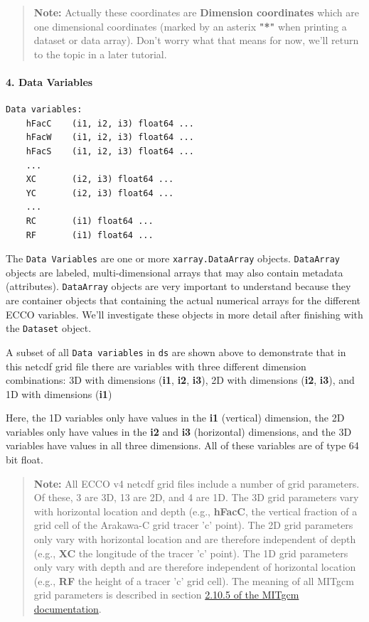 \documentclass[11pt]{article}
\begin{document}
\begin{quote}
\textbf{Note:} Actually these coordinates are \textbf{Dimension
coordinates} which are one dimensional coordinates (marked by an asterix
\textbf{"*"} when printing a dataset or data array). Don't worry what
that means for now, we'll return to the topic in a later tutorial.
\end{quote}

\paragraph{4. Data Variables}\label{data-variables}

\begin{verbatim}
Data variables:
    hFacC    (i1, i2, i3) float64 ...
    hFacW    (i1, i2, i3) float64 ...
    hFacS    (i1, i2, i3) float64 ...
    ...
    XC       (i2, i3) float64 ...
    YC       (i2, i3) float64 ...
    ...
    RC       (i1) float64 ...
    RF       (i1) float64 ...
\end{verbatim}

The \texttt{Data\ Variables} are one or more \texttt{xarray.DataArray}
objects. \texttt{DataArray} objects are labeled, multi-dimensional
arrays that may also contain metadata (attributes). \texttt{DataArray}
objects are very important to understand because they are container
objects that containing the actual numerical arrays for the different
ECCO variables. We'll investigate these objects in more detail after
finishing with the \texttt{Dataset} object.

A subset of all \texttt{Data\ variables} in \texttt{ds} are shown above
to demonstrate that in this netcdf grid file there are variables with
three different dimension combinations: 3D with dimensions (\textbf{i1},
\textbf{i2}, \textbf{i3}), 2D with dimensions (\textbf{i2},
\textbf{i3}), and 1D with dimensions (\textbf{i1})

Here, the 1D variables only have values in the \textbf{i1} (vertical)
dimension, the 2D variables only have values in the \textbf{i2} and
\textbf{i3} (horizontal) dimensions, and the 3D variables have values in
all three dimensions. All of these variables are of type 64 bit float.

\begin{quote}
\textbf{Note:} All ECCO v4 netcdf grid files include a number of grid
parameters. Of these, 3 are 3D, 13 are 2D, and 4 are 1D. The 3D grid
parameters vary with horizontal location and depth (e.g.,
\textbf{hFacC}, the vertical fraction of a grid cell of the Arakawa-C
grid tracer 'c' point). The 2D grid parameters only vary with horizontal
location and are therefore independent of depth (e.g., \textbf{XC} the
longitude of the tracer 'c' point). The 1D grid parameters only vary
with depth and are therefore independent of horizontal location (e.g.,
\textbf{RF} the height of a tracer 'c' grid cell). The meaning of all
MITgcm grid parameters is described in section
\href{http://mitgcm.org/sealion/online_documents/node47.html}{2.10.5 of
the MITgcm documentation}.
\end{quote}
\end{document}
